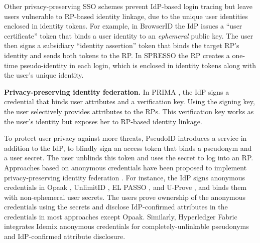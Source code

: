 Other privacy-preserving SSO schemes prevent IdP-based login tracing but leave users vulnerable to RP-based identity linkage, due to the unique user identities enclosed in identity tokens.
For example, in BrowserID \cite{BrowserID} %
the IdP %
issues a ``user certificate'' token that binds a user identity to an \emph{ephemeral} public key. The user then signs a subsidiary ``identity assertion'' token that binds the target RP's identity and sends both tokens to the RP. In SPRESSO \cite{SPRESSO} the RP creates a one-time pseudo-identity in each login, which is enclosed in identity tokens along with the user's unique identity.

\newc
\noindent\textbf{Privacy-preserving identity federation.}
\oldc
In PRIMA \cite{prima}, the IdP signs a credential
that binds user attributes and a verification key. Using the signing key, the user selectively provides attributes to the RPs. %
This verification key works as the user's identity but exposes her to RP-based identity linkage.

To protect user privacy against more threats, PseudoID \cite{PseudoID} introduces a service in addition to the IdP,
 to blindly sign \cite{blind-sign}
an access token that binds a pseudonym and a user secret. The user unblinds this token and uses the secret to log into an RP. Approaches based on anonymous credentials \cite{anon-credential-2001, idemix, anon-credential} have been proposed to implement privacy-preserving identity federation \cite{hyperledge-idemix, Opaak, uprov, UnlimitID, ELPASSO}. For instance, the IdP signs anonymous credentials in Opaak \cite{Opaak}, UnlimitID \cite{UnlimitID}, EL PASSO \cite{ELPASSO}, and U-Prove \cite{uprov,uprove-conference}, and binds them with non-ephemeral user secrets. %
The users prove ownership of the anonymous credentials using the secrets and disclose IdP-confirmed attributes in the credentials in most approaches except Opaak. Similarly, Hyperledger Fabric \cite{hyperledge-idemix} integrates Idemix anonymous credentials \cite{idemix} for completely-unlinkable pseudonyms and IdP-confirmed attribute disclosure.


